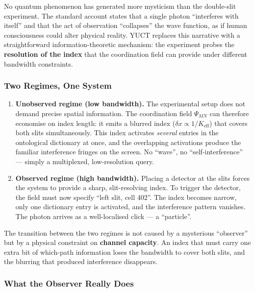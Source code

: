 \documentclass[12pt,a4paper]{article}
\theoremstyle{remark}
\begin{document}
	No quantum phenomenon has generated more mysticism than the
	double-slit experiment.  The standard account states that a single
	photon ``interferes with itself'' and that the act of observation
	``collapses'' the wave function, as if human consciousness could
	alter physical reality.  YUCT replaces this narrative with a
	straightforward information-theoretic mechanism: the experiment
	probes the \textbf{resolution of the index} that the coordination
	field can provide under different bandwidth constraints.
	
	\subsubsection{Two Regimes, One System}
	
	\begin{enumerate}[leftmargin=*]
		\item \textbf{Unobserved regime (low bandwidth).}
		The experimental setup does not demand precise spatial
		information.  The coordination field $\Psi_{MN}$ can
		therefore economise on index length: it emits a blurred index
		($\delta x \propto 1/K_{\mathrm{eff}}$) that covers both
		slits simultaneously.  This index activates \emph{several}
		entries in the ontological dictionary at once, and the
		overlapping activations produce the familiar interference
		fringes on the screen.  No ``wave'', no ``self-interference''
		--- simply a multiplexed, low-resolution query.
		
		\item \textbf{Observed regime (high bandwidth).}
		Placing a detector at the slits forces the system to provide
		a sharp, slit-resolving index.  To trigger the detector, the
		field must now specify ``left slit, cell 402''.  The index
		becomes narrow, only one dictionary entry is activated, and
		the interference pattern vanishes.  The photon arrives as a
		well-localised click --- a ``particle''.
	\end{enumerate}
	
	The transition between the two regimes is not caused by a
	mysterious ``observer'' but by a physical constraint on
	\textbf{channel capacity}.  An index that must carry one extra bit
	of which-path information loses the bandwidth to cover both slits,
	and the blurring that produced interference disappears.
	
	\subsubsection{What the Observer Really Does}
	
\end{document}
